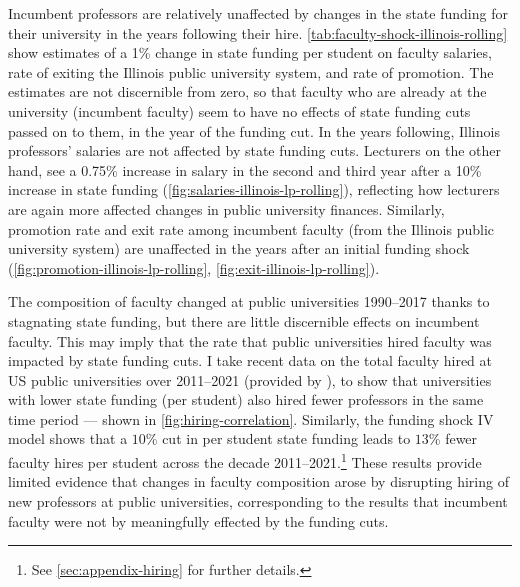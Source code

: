 Incumbent professors are relatively unaffected by changes in the state funding for their university in the years following their hire.
\autoref{tab:faculty-shock-illinois-rolling} show estimates of a 1\% change in state funding per student on faculty salaries, rate of exiting the Illinois public university system, and rate of promotion.
The estimates are not discernible from zero, so that faculty who are already at the university (incumbent faculty) seem to have no effects of state funding cuts passed on to them, in the year of the funding cut.
In the years following, Illinois professors' salaries are not affected by state funding cuts.
Lecturers on the other hand, see a 0.75\% increase in salary in the second and third year after a 10\% increase in state funding (\autoref{fig:salaries-illinois-lp-rolling}), reflecting how lecturers are again more affected changes in public university finances.
Similarly, promotion rate and exit rate among incumbent faculty  (from the Illinois public university system) are unaffected in the years after an initial funding shock (\autoref{fig:promotion-illinois-lp-rolling}, \ref{fig:exit-illinois-lp-rolling}).


The composition of faculty changed at public universities 1990--2017 thanks to stagnating state funding, but there are little discernible effects on incumbent faculty.
This may imply that the rate that public universities hired faculty was impacted by state funding cuts.
I take recent data on the total faculty hired at US public universities over 2011--2021 (provided by \citealt{wapman2022quantifying}), to show that universities with lower state funding (per student) also hired fewer professors in the same time period --- shown in \autoref{fig:hiring-correlation}.
Similarly, the funding shock IV model shows that a $10$\% cut in per student state funding leads to $13$\% fewer faculty hires per student across the decade 2011--2021.\footnote{
    See \autoref{sec:appendix-hiring} for further details.
}
These results provide limited evidence that changes in faculty composition arose by disrupting hiring of new professors at public universities, corresponding to the results that incumbent faculty were not by meaningfully effected by the funding cuts.
